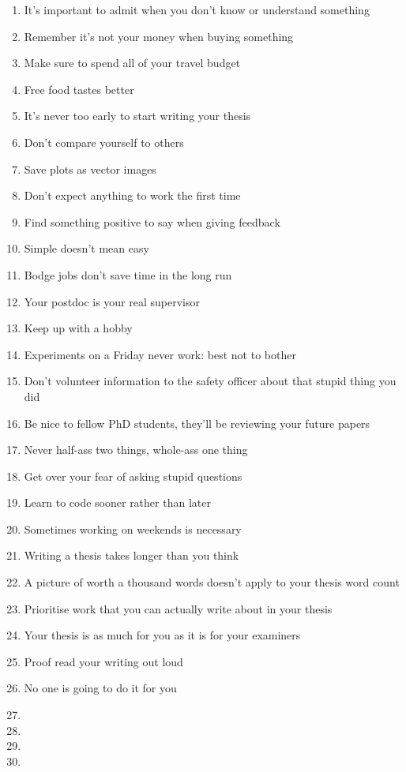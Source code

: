 \begin{enumerate}
	\item It's important to admit when you don't know or understand something
	\item Remember it's not your money when buying something
	\item Make sure to spend all of your travel budget
	\item Free food tastes better
	\item It's never too early to start writing your thesis
	\item Don't compare yourself to others
	\item Save plots as vector images
	\item Don't expect anything to work the first time
	\item Find something positive to say when giving feedback
	\item Simple doesn't mean easy
	\item Bodge jobs don't save time in the long run
	\item Your postdoc is your real supervisor
	\item Keep up with a hobby
	\item Experiments on a Friday never work: best not to bother
	\item Don't volunteer information to the safety officer about that stupid thing you did 
	\item Be nice to fellow PhD students, they'll be reviewing your future papers
	\item Never half-ass two things, whole-ass one thing
	\item Get over your fear of asking stupid questions
	\item Learn to code sooner rather than later
	\item Sometimes working on weekends is necessary
	\item Writing a thesis takes longer than you think
	\item A picture of worth a thousand words doesn't apply to your thesis word count
	\item Prioritise work that you can actually write about in your thesis
	\item Your thesis is as much for you as it is for your examiners 
	\item Proof read your writing out loud
	\item No one is going to do it for you
	\item 
	\item
	\item
	\item

\end{enumerate}
